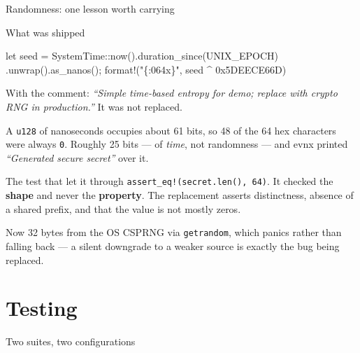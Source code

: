 \documentclass[aspectratio=169,10pt]{beamer}
\begin{document}
\begin{frame}[fragile]{Randomness: one lesson worth carrying}
  \begin{alertblock}{What was shipped}
\begin{semiverbatim}\scriptsize
let seed = SystemTime::now().duration_since(UNIX_EPOCH)
             .unwrap().as_nanos();
format!("\{:064x\}", seed ^ 0x5DEECE66D)
\end{semiverbatim}
  With the comment: \emph{``Simple time-based entropy for demo; replace with
  crypto RNG in production.''} It was not replaced.
  \end{alertblock}

  \vspace{0.5em}
  A \texttt{u128} of nanoseconds occupies about 61 bits, so 48 of the 64 hex
  characters were always \texttt{0}. Roughly 25 bits --- of \emph{time}, not
  randomness --- and evnx printed \emph{``Generated secure secret''} over it.

  \vspace{0.6em}
  \begin{block}{The test that let it through}
    \texttt{assert\_eq!(secret.len(), 64)}. It checked the \textbf{shape} and
    never the \textbf{property}. The replacement asserts distinctness, absence
    of a shared prefix, and that the value is not mostly zeros.
  \end{block}

  {\footnotesize Now 32 bytes from the OS CSPRNG via \texttt{getrandom}, which
  panics rather than falling back --- a silent downgrade to a weaker source is
  exactly the bug being replaced.}
\end{frame}

\section{Testing}

\begin{frame}[fragile]{Two suites, two configurations}
\end{frame}
\end{document}
